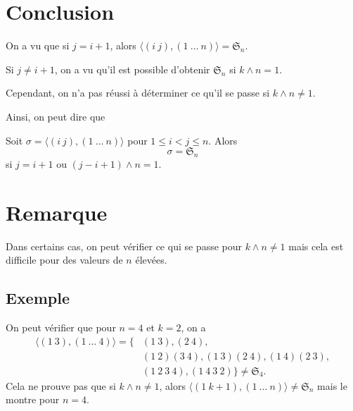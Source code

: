 \documentclass[french,a4paper,10pt]{article}
\begin{document}
    \section*{Conclusion}

    On a vu que si \( j = i+1 \), alors \( \langle (i~j), (1~\ldots~n) \rangle = \mathfrak S_n \).

    Si \( j \neq i+1 \), on a vu qu'il est possible d'obtenir \( \mathfrak S_n \) si \( k\wedge n = 1 \).

    Cependant, on n'a pas réussi à déterminer ce qu'il se passe si \( k\wedge n \neq 1 \).

    Ainsi, on peut dire que

    \begin{theorem}
        Soit \( \sigma = \langle (i~j), (1~\ldots~n) \rangle \) pour \( 1 \leq i < j \leq n \). Alors
        \begin{equation*}
            \sigma = \mathfrak S_n
        \end{equation*}
        si \( j = i+1 \) ou \( (j-i+1)\wedge n = 1 \).
    \end{theorem}

    \section*{Remarque}

    Dans certains cas, on peut vérifier ce qui se passe pour \( k\wedge n \neq 1 \) 
    mais cela est difficile pour des valeurs de \( n \) élevées.

    \subsection*{Exemple}

    On peut vérifier que pour \( n = 4\) et \(k = 2\), on a
    \begin{equation*}
        \begin{aligned}
            \langle (1~3), (1~\ldots~4) \rangle
            = \{&(1~3), (2~4),\\
            &(1~2)(3~4), (1~3)(2~4), (1~4)(2~3),\\
            &(1~2~3~4), (1~4~3~2)
            \}\neq \mathfrak S_4.
        \end{aligned}
    \end{equation*}
    Cela ne prouve pas que si \( k\wedge n \neq 1 \), alors \( \langle (1~k+1), (1~\ldots~n) \rangle \neq \mathfrak S_n \)
    mais le montre pour \( n = 4 \).
\end{document}
